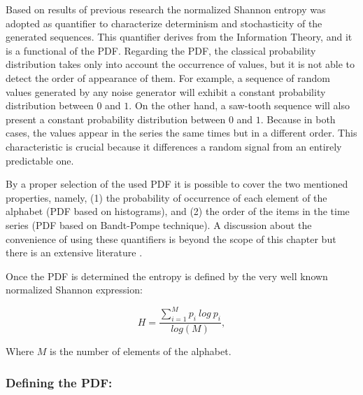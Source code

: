 Based on results of previous research \cite{DeMicco2008,Antonelli2016,DeMicco2011} the normalized Shannon entropy was adopted as quantifier to characterize determinism and stochasticity of the generated sequences. This quantifier derives from the Information Theory, and it is a functional of the PDF. Regarding the PDF, the classical probability distribution takes only into account the occurrence of values, but it is not able to detect the order of appearance of them. For example, a sequence of random values generated by any noise generator will exhibit a constant probability distribution between $0$ and $1$. On the other hand, a saw-tooth sequence will also present a constant probability distribution between $0$ and $1$. Because in both cases, the values appear in the series the same times but in a different order. This characteristic is crucial because it differences a random signal from an entirely predictable one. 
 
By a proper selection of the used PDF it is possible to cover the two mentioned properties, namely, (1) the probability of occurrence of each element of the alphabet (PDF based on histograms), and (2) the order of the items in the time series (PDF based on Bandt-Pompe technique).
A discussion about the convenience of using these quantifiers is beyond the scope of this chapter but there is an extensive literature \cite{Rosso2007A,DeMicco2008,Martin2006}.

Once the PDF is determined the entropy is defined by the very well known normalized Shannon expression:

\begin{equation}
H=\frac{\sum_{i=1}^{M}{p_i~log~p_i}}{log(M)}, \label{eq:shannon}
\end{equation}

Where $M$ is the number of elements of the alphabet.
\subsubsection{Defining the PDF:}


